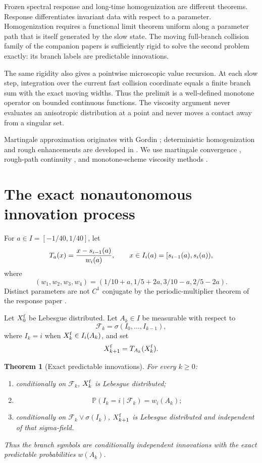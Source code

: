 \documentclass[11pt,reqno]{amsart}
\newtheorem{theorem}{Theorem}[section]
\theoremstyle{definition}
\theoremstyle{remark}
\newcommand{\Pp}{\mathbb P}
\newcommand{\F}{\mathcal F}
\begin{document}
Frozen spectral response and long-time homogenization are different theorems.
Response differentiates invariant data with respect to a parameter.
Homogenization requires a functional limit theorem uniform along a parameter
path that is itself generated by the slow state.  The moving full-branch
collision family of the companion papers is sufficiently rigid to solve the
second problem exactly: its branch labels are predictable innovations.

The same rigidity also gives a pointwise microscopic value recursion.  At each
slow step, integration over the current fast collision coordinate equals a
finite branch sum with the exact moving widths.  Thus the prelimit is a
well-defined monotone operator on bounded continuous functions.  The viscosity
argument never evaluates an anisotropic distribution at a point and never
moves a contact away from a singular set.

Martingale approximation originates with Gordin \cite{Gordin1969}; deterministic
homogenization and rough enhancements are developed in
\cite{MelbourneStuart2011,KellyMelbourne2016,KellyMelbourne2017,
ChevyrevFrizKorepanovMelbourne2020}.  We use martingale convergence
\cite{HallHeyde1980,JacodShiryaev2003}, rough-path continuity
\cite{Lyons1998,FrizVictoir2010,FrizHairer2014}, and monotone-scheme viscosity
methods \cite{BarlesSouganidis1991,CrandallIshiiLions1992}.

\section{The exact nonautonomous innovation process}

For $a\in I=[-1/40,1/40]$, let
\[
 T_a(x)={x-s_{i-1}(a)\over w_i(a)},
 \qquad x\in I_i(a)=[s_{i-1}(a),s_i(a)),
\]
where
\[
 (w_1,w_2,w_3,w_4)
 =(1/10+a,1/5+2a,3/10-a,2/5-2a).
\]
Distinct parameters are not $C^1$ conjugate by the periodic-multiplier theorem
of the response paper \cite{QiResponseRound4}.

Let $X_0^{\rm f}$ be Lebesgue distributed.  Let $A_k\in I$ be measurable with
respect to
\[
 \F_k=\sigma(I_0,\ldots,I_{k-1}),
\]
where $I_k=i$ when $X_k^{\rm f}\in I_i(A_k)$, and set
\[
 X_{k+1}^{\rm f}=T_{A_k}(X_k^{\rm f}).
\]

\begin{theorem}[Exact predictable innovations]\label{thm:innovations}
For every $k\ge0$:
\begin{enumerate}[label=(\roman*)]
\item conditionally on $\F_k$, $X_k^{\rm f}$ is Lebesgue distributed;
\item
\[
 \Pp(I_k=i\mid\F_k)=w_i(A_k);
\]
\item conditionally on $\F_k\vee\sigma(I_k)$,
$X_{k+1}^{\rm f}$ is Lebesgue distributed and independent of that sigma-field.
\end{enumerate}
Thus the branch symbols are conditionally independent innovations with the
exact predictable probabilities $w(A_k)$.
\end{theorem}
\end{document}
